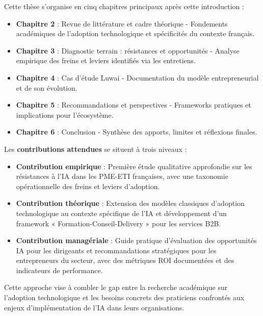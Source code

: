 Cette thèse s'organise en cinq chapitres principaux après cette introduction :
\bigskip
\begin{itemize}
    \item \textbf{Chapitre 2} : Revue de littérature et cadre théorique - Fondements académiques de l'adoption technologique et spécificités du contexte français.
    \item \textbf{Chapitre 3} : Diagnostic terrain : résistances et opportunités - Analyse empirique des freins et leviers identifiés via les entretiens.
    \item \textbf{Chapitre 4} : Cas d'étude Luwai - Documentation du modèle entrepreneurial et de son évolution.
    \item \textbf{Chapitre 5} : Recommandations et perspectives - Frameworks pratiques et implications pour l'écosystème.
    \item \textbf{Chapitre 6} : Conclusion - Synthèse des apports, limites et réflexions finales.
\end{itemize}
\medskip
Les \textbf{contributions attendues} se situent à trois niveaux :
\bigskip
\begin{itemize}
    \item \textbf{Contribution empirique} : Première étude qualitative approfondie sur les résistances à l'IA dans les PME-ETI françaises, avec une taxonomie opérationnelle des freins et leviers d'adoption.
    \item \textbf{Contribution théorique} : Extension des modèles classiques d'adoption technologique au contexte spécifique de l'IA et développement d'un framework « Formation-Conseil-Delivery » pour les services B2B.
    \item \textbf{Contribution managériale} : Guide pratique d'évaluation des opportunités IA pour les dirigeants et recommandations stratégiques pour les entrepreneurs du secteur, avec des métriques ROI documentées et des indicateurs de performance.
\end{itemize}
\medskip
Cette approche vise à combler le gap entre la recherche académique sur l'adoption technologique et les besoins concrets des praticiens confrontés aux enjeux d'implémentation de l'IA dans leurs organisations.

